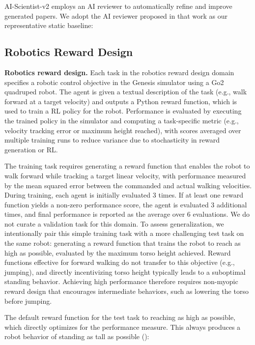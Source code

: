 \documentclass[]{fairmeta}
\begin{document}
AI-Scientist-v2 \citep{yamada2025ai} employs an AI reviewer to automatically refine and improve generated papers. We adopt the AI reviewer proposed in that work as our representative static baseline:


\subsection{Robotics Reward Design}
\label{app:domain-genesis}

\textbf{Robotics reward design.}
Each task in the robotics reward design domain specifies a robotic control objective in the Genesis simulator \citep{genesis2024} using a Go2 quadruped robot. The agent is given a textual description of the task (e.g., walk forward at a target velocity) and outputs a Python reward function, which is used to train a RL policy \citep[i.e., PPO,][]{schulman2017proximal} for the robot. Performance is evaluated by executing the trained policy in the simulator and computing a task-specific metric (e.g., velocity tracking error or maximum height reached), with scores averaged over multiple training runs to reduce variance due to stochasticity in reward generation or RL.

The training task requires generating a reward function that enables the robot to walk forward while tracking a target linear velocity, with performance measured by the mean squared error between the commanded and actual walking velocities. During training, each agent is initially evaluated 3 times. If at least one reward function yields a non-zero performance score, the agent is evaluated 3 additional times, and final performance is reported as the average over 6 evaluations. We do not curate a validation task for this domain. To assess generalization, we intentionally pair this simple training task with a more challenging test task on the same robot: generating a reward function that trains the robot to reach as high as possible, evaluated by the maximum torso height achieved. Reward functions effective for forward walking do not transfer to this objective (e.g., jumping), and directly incentivizing torso height typically leads to a suboptimal standing behavior. Achieving high performance therefore requires non-myopic reward design that encourages intermediate behaviors, such as lowering the torso before jumping.

The default reward function for the test task to reaching as high as possible, which directly optimizes for the performance measure. This always produces a robot behavior of standing as tall as possible ():

\end{document}
